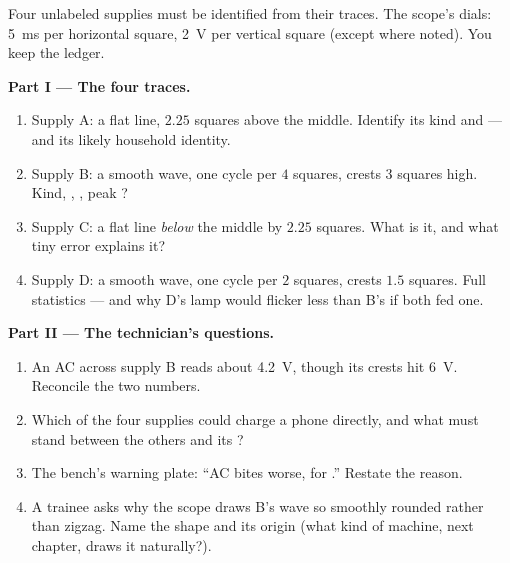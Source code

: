 \begin{problem}\label{pb:g9:alternating-current:1}
Four unlabeled supplies must be identified from their
traces. The scope's dials: \qty{5}{ms} per horizontal
square, \qty{2}{V} per vertical square (except where
noted). You keep the ledger.

\medskip\noindent\textbf{Part I --- The four traces.}
\begin{enumerate}
  \item Supply A: a flat line, $2.25$ squares above the
        middle. Identify its kind and  --- and its
        likely household identity.
  \item Supply B: a smooth wave, one cycle per $4$
        squares, crests $3$ squares high. Kind, ,
        , peak ?
  \item Supply C: a flat line \emph{below} the middle by
        $2.25$ squares. What is it, and what tiny error
        explains it?
  \item Supply D: a smooth wave, one cycle per $2$
        squares, crests $1.5$ squares. Full statistics ---
        and why D's lamp would flicker less than B's if
        both fed one.
\end{enumerate}

\medskip\noindent\textbf{Part II --- The technician's
questions.}
\begin{enumerate}[resume]
  \item An AC  across supply B reads about
        \qty{4.2}{V}, though its crests hit \qty{6}{V}.
        Reconcile the two numbers.
  \item Which of the four supplies could charge a phone
        directly, and what must stand between the others
        and its ?
  \item The bench's warning plate: ``AC bites worse,
         for .'' Restate the reason.
  \item A trainee asks why the scope draws B's wave so
        smoothly rounded rather than zigzag. Name the
        shape and its origin (what kind of machine, next
        chapter, draws it naturally?).
\end{enumerate}


\end{problem}
